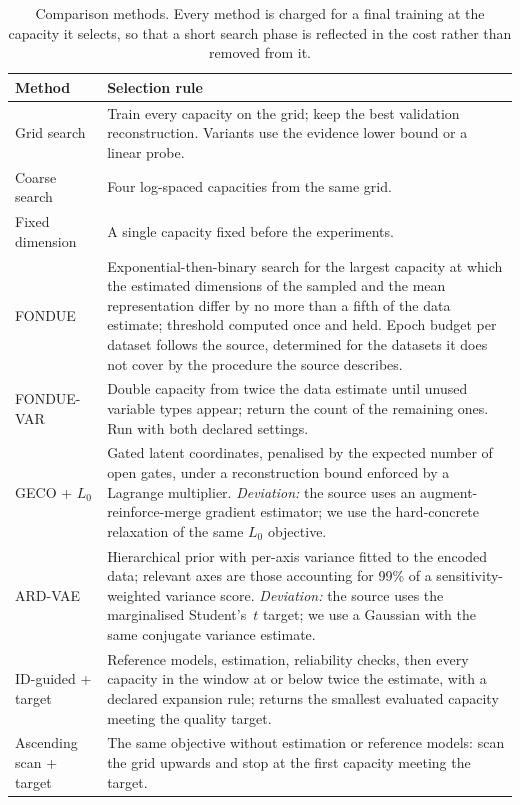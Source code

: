 \documentclass[make,article,submit,pdftex,moreauthors]{Definitions/mdpi}
\begin{document}
\begin{table}[H]
\caption{Comparison methods. Every method is charged for a final training
at the capacity it selects, so that a short search phase is reflected in
the cost rather than removed from it.}
\label{tab:methods_def}
\begin{tabularx}{\textwidth}{lX}
\toprule
\textbf{Method} & \textbf{Selection rule} \\
\midrule
Grid search & Train every capacity on the grid; keep the best validation
reconstruction. Variants use the evidence lower bound or a linear probe. \\
Coarse search & Four log-spaced capacities from the same grid. \\
Fixed dimension & A single capacity fixed before the experiments. \\
FONDUE & Exponential-then-binary search for the largest capacity at which
the estimated dimensions of the sampled and the mean representation differ
by no more than a fifth of the data estimate; threshold computed once and
held. Epoch budget per dataset follows the source, determined for the
datasets it does not cover by the procedure the source describes. \\
FONDUE-VAR & Double capacity from twice the data estimate until unused
variable types appear; return the count of the remaining ones. Run with
both declared settings. \\
GECO + $L_0$ & Gated latent coordinates, penalised by the expected number
of open gates, under a reconstruction bound enforced by a Lagrange
multiplier. \emph{Deviation:} the source uses an augment-reinforce-merge
gradient estimator; we use the hard-concrete relaxation of the same
$L_0$ objective. \\
ARD-VAE & Hierarchical prior with per-axis variance fitted to the encoded
data; relevant axes are those accounting for 99\% of a
sensitivity-weighted variance score. \emph{Deviation:} the source uses the
marginalised Student's~$t$ target; we use a Gaussian with the same
conjugate variance estimate. \\
ID-guided + target & Reference models, estimation, reliability checks,
then every capacity in the window at or below twice the estimate, with a
declared expansion rule; returns the smallest evaluated capacity meeting
the quality target. \\
Ascending scan + target & The same objective without estimation or
reference models: scan the grid upwards and stop at the first capacity
meeting the target. \\
\bottomrule
\end{tabularx}
\end{table}
\end{document}
